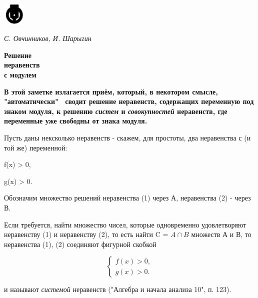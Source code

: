 \setcounter{page}{58}

\pagestyle{fancy}
\fancyhead{}
\fancyfoot{} 
\fancyfoot[L]{\thepage}

\twocolumn

\begin{flushleft}
    \includegraphics[width=0.08\textwidth]{picture}
\end{flushleft}
\vspace*{3mm}
\begin{flushleft}
\textit{С. Овчинников, И. Шарыгин}

\huge{\textbf{Решение \\неравенств \\с модулем}} 
\end{flushleft}


\begin{small}
\noindent 
\textbf{В этой заметке излагается приём, который, в некотором смысле, "автоматически" \ сводит решение неравенств, содержащих переменную под знаком модуля, к решению \textit{систем} и \textit{совокупностей} неравенств, где переменные уже свободны от знака модуля.} 
\end{small}
\vspace*{3mm}

\noindent Пусть даны нексколько неравенств - скажем, для простоты, два неравенства с  (и той же) переменной:

\noindent
\hfill f(x) > 0, \hfill {}

\noindent
\hfill g(x) > 0. \hfill {}

\noindent Обозначим множество решений неравенства (1) через А, неравенства (2) - через В.

Если требуется, найти множество чисел, которые одновременно удовлетворяют неравенству (1) и неравенству (2), то есть найти  C = $A\cap B$ множеств А и В, то неравенства (1), (2) соединяют фигурной скобкой

\[ 
  \begin{cases}
    f(x) > 0,\\
    g(x) > 0.
  \end{cases}
\]

\noindent и называют \textit{системой} неравенств ("Алгебра и начала анализа 10", п. 123).

